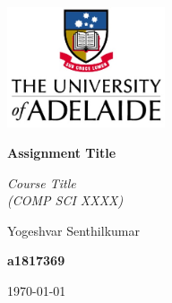 \documentclass[12pt,a4paper]{article}
\newcommand{\titlestr}{Assignment Title}
\newcommand{\authorstr}{Yogeshvar Senthilkumar}
\begin{document}
\begin{titlepage}
  \centering
  \includegraphics[width=0.35\textwidth]{UoA.jpg}

  \vspace{1cm}
  {\LARGE \bf{\titlestr} \par}
  
  \vspace{.5cm}
  {\LARGE {\it{Course Title} \\ (COMP SCI XXXX)} \par}

  \vspace{1cm}
  {\Large \authorstr \par}

  {\bf a1817369}

  \vspace{1cm}
  \today    

  \vfill
\end{titlepage}

\newpage
\end{document}
